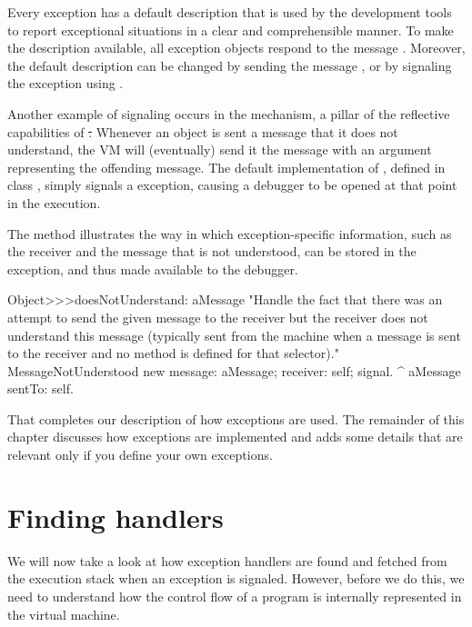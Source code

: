 Every exception has a default description that is used by the development tools to report exceptional situations in a clear and comprehensible manner. To make the description available, all exception objects respond to the message . Moreover, the default description can be changed by sending the message , or by signaling the exception using .

Another example of signaling occurs in the  mechanism, a pillar of the reflective capabilities of \st. Whenever an object is sent a message that it does not understand, the VM will (eventually) send it the message  with an argument representing the offending message. The default implementation of , defined in class , simply signals a  exception, causing a debugger to be opened at that point in the execution.

The  method illustrates the way in which exception-specific information, such as the receiver and the message that is not understood, can be stored in the exception, and thus made available to the debugger.

\begin{code}{}
Object>>>doesNotUnderstand: aMessage 
	 "Handle the fact that there was an attempt to send the given message to the receiver but the receiver does not understand this message (typically sent from the machine when a message is sent to the receiver and no method is defined for that selector)."
	MessageNotUnderstood new 
		message: aMessage;
		receiver: self;
		signal.
	^ aMessage sentTo: self.
\end{code}

That completes our description of how exceptions are used.  The remainder of this chapter discusses how exceptions are implemented and adds some details that are relevant only if you define your own exceptions.



\section{Finding handlers}

We will now take a look at how exception handlers are found and fetched from the execution stack when an exception is signaled. 
However, before we do this, we need to understand how the control flow of a program is internally represented in the virtual machine.

